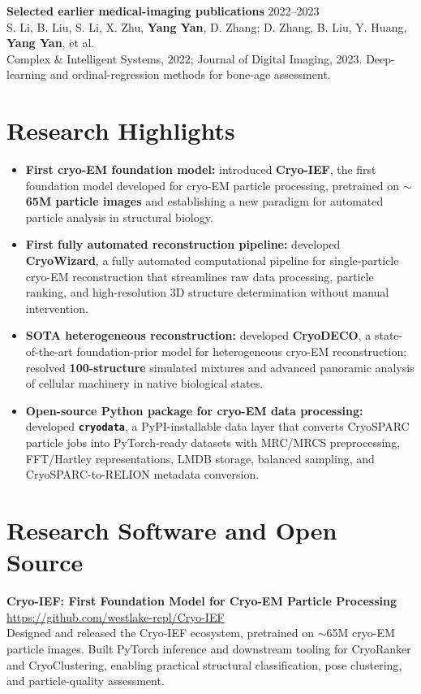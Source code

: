 \documentclass[10pt,letterpaper]{article}
\newcommand{\projectentry}[4]{%
  \Needspace{4.4\baselineskip}%
  \noindent
  \begin{minipage}[t]{0.14\linewidth}
    \vspace{0pt}{\small\color{Muted}#1}
  \end{minipage}\hfill
  \begin{minipage}[t]{0.83\linewidth}
    \vspace{0pt}\RaggedRight
    \textbf{#2}\\[-1pt]
    {\small\href{#3}{#3}}\\[-1pt]
    #4
  \end{minipage}\par\vspace{4pt}
}
\newcommand{\pub}[4]{%
  \textbf{#1} \hfill {\small\color{Muted}#4}\\[-1pt]
  #2\\[-1pt]
  {\small\color{Muted}#3}\vspace{2.5pt}
}
\begin{document}
\pub{Selected earlier medical-imaging publications}
{S. Li, B. Liu, S. Li, X. Zhu, \textbf{Yang Yan}, D. Zhang; D. Zhang, B. Liu, Y. Huang, \textbf{Yang Yan}, et al.}
{Complex \& Intelligent Systems, 2022; Journal of Digital Imaging, 2023. Deep-learning and ordinal-regression methods for bone-age assessment.}
{2022--2023}

\newpage

\section*{Research Highlights}
\begin{itemize}
  \item \textbf{First cryo-EM foundation model:} introduced \textbf{Cryo-IEF}, the first foundation model developed for cryo-EM particle processing, pretrained on \textbf{$\sim$65M particle images} and establishing a new paradigm for automated particle analysis in structural biology.
  \item \textbf{First fully automated reconstruction pipeline:} developed \textbf{CryoWizard}, a fully automated computational pipeline for single-particle cryo-EM reconstruction that streamlines raw data processing, particle ranking, and high-resolution 3D structure determination without manual intervention.
  \item \textbf{SOTA heterogeneous reconstruction:} developed \textbf{CryoDECO}, a state-of-the-art foundation-prior model for heterogeneous cryo-EM reconstruction; resolved \textbf{100-structure} simulated mixtures and advanced panoramic analysis of cellular machinery in native biological states.
  \item \textbf{Open-source Python package for cryo-EM data processing:} developed \textbf{\texttt{cryodata}}, a PyPI-installable data layer that converts CryoSPARC particle jobs into PyTorch-ready datasets with MRC/MRCS preprocessing, FFT/Hartley representations, LMDB storage, balanced sampling, and CryoSPARC-to-RELION metadata conversion.
\end{itemize}


\section*{Research Software and Open Source}
\projectentry{2023--2026}{Cryo-IEF: First Foundation Model for Cryo-EM Particle Processing}{https://github.com/westlake-repl/Cryo-IEF}{Designed and released the Cryo-IEF ecosystem, pretrained on $\sim$65M cryo-EM particle images. Built PyTorch inference and downstream tooling for CryoRanker and CryoClustering, enabling practical structural classification, pose clustering, and particle-quality assessment.}
\end{document}
